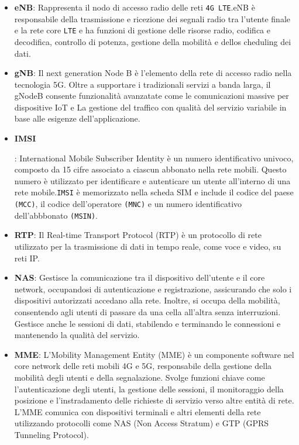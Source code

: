 \documentclass[english]{article}
\begin{document}
\begin{itemize}
	\item \textbf{eNB}\hypertarget{eNB}{}: Rappresenta il  nodo di accesso radio delle reti
	      \texttt{4G LTE}.\@ eNB è responsabile della trasmissione e ricezione dei segnali radio
	      tra l'utente finale e la rete core \texttt{LTE} e ha funzioni di gestione delle risorse radio,
	      codifica e decodifica, controllo di potenza, gestione della mobilità e dellos cheduling dei dati.

	\item \textbf{gNB}\hypertarget{gNB}{}: Il next generation Node B è l'elemento
	      della rete di accesso radio nella tecnologia 5G.
	      Oltre a supportare i tradizionali servizi a banda larga, il gNodeB consente
	      funzionalità avanzatate come le comunicazioni massive per dispositive IoT e La
	      gestione del traffico con qualità del servizio variabile in base alle
	      esigenze dell'applicazione.

	\item \hypertarget{IMSI}{\textbf{IMSI}}: International Mobile Subscriber Identity
	      è un numero identificativo univoco,
	      composto da 15 cifre associato a ciascun abbonato nella rete mobili.
	      Questo numero è utilizzato per identificare e autenticare un utente all'interno
	      di una rete mobile.\@ \texttt{IMSI} è memorizzato nella scheda SIM e include il
	      codice del paese \texttt{(MCC)},
	      il codice dell'operatore \texttt{(MNC)}
	      e un numero identificativo dell'abbbonato \texttt{(MSIN)}.

	\item \textbf{\hypertarget{RTP}{RTP}}: Il Real-time Transport Protocol (RTP) è un protocollo
	      di rete utilizzato per la trasmissione di dati in tempo reale, come voce e video, su reti IP.\@

	\item \textbf{\hypertarget{NAS}{NAS}}: Gestisce la comunicazione tra il dispositivo dell'utente e il core network,
	      occupandosi di autenticazione e registrazione,
	      assicurando che solo i dispositivi autorizzati accedano alla rete.
	      Inoltre, si occupa della mobilità, consentendo agli utenti di passare da una
	      cella all'altra senza interruzioni. Gestisce anche le sessioni di dati,
	      stabilendo e terminando le connessioni e mantenendo la qualità del servizio.

	\item \textbf{\hypertarget{MME}{MME}}: L'Mobility Management Entity (MME)
	      è un componente software nel core network delle reti mobili 4G e 5G, responsabile della
	      gestione della mobilità degli utenti e della segnalazione.
	      Svolge funzioni chiave come l'autenticazione degli utenti, la gestione delle sessioni,
	      il monitoraggio della posizione e l'instradamento delle richieste di servizio verso
	      altre entità di rete. L'MME comunica con dispositivi terminali e altri elementi
	      della rete utilizzando protocolli come NAS (Non Access Stratum) e
	      GTP (GPRS Tunneling Protocol).
\end{itemize}
\clearpage
\printbibliography
\end{document}
